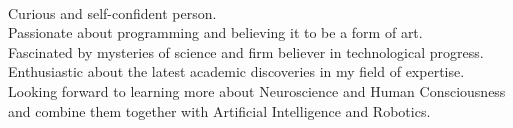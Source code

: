 \documentclass[9pt]{developercv} %
\begin{document}
\begin{minipage}[t]{0.40\textwidth} %
	\vspace{-\baselineskip} %
        \\
        Curious and self-confident person.\\
        Passionate about programming and believing it to be a form of art.\\
        Fascinated by mysteries of science and firm believer in technological progress.\\
        Enthusiastic about the latest academic discoveries in my field of expertise.\\
        Looking forward to learning more about Neuroscience and Human Consciousness and combine them together with Artificial Intelligence and Robotics.

     \vspace{0.1cm}

        \\
        \begin{center}
        \end{center}

\end{minipage}
\hfill %
\begin{minipage}[t]{0.5\textwidth} %
	\vspace{-\baselineskip} %

	\begin{barchart}{5.5}
	\end{barchart}

        \vspace{0.5cm}
        \vspace{0.5cm}

	\begin{barchart}{5.5}
	\end{barchart}

   \end{minipage}
\end{document}
